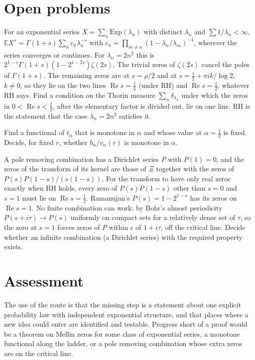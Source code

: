 \section{Open problems}\label{kr:sec:problems}
\begin{problem}\label{kr:prob:mellin}
For an exponential series $X=\sum_n\mathrm{Exp}(\lambda_n)$ with distinct $\lambda_n$ and $\sum1/\lambda_n<\infty$, $\mathbb EX^s=\Gamma(1+s)\sum_nc_n\lambda_n^{-s}$ with $c_n=\prod_{m\ne n}(1-\lambda_n/\lambda_m)^{-1}$, wherever the series converges or continues. For $\lambda_n=2n^2$ this is $2^{1-s}\Gamma(1+s)(1-2^{1-2s})\zeta(2s)$. The trivial zeros of $\zeta(2s)$ cancel the poles of $\Gamma(1+s)$. The remaining zeros are at $s=\rho/2$ and at $s=\frac12+\pi ik/\log2$, $k\ne0$, so they lie on the two lines $\operatorname{Re}s=\frac14$ (under RH) and $\operatorname{Re}s=\frac12$, whatever RH says. Find a condition on the Thorin measure $\sum_n\delta_{\lambda_n}$ under which the zeros in $0<\operatorname{Re}s<\frac12$, after the elementary factor is divided out, lie on one line. RH is the statement that the case $\lambda_n=2n^2$ satisfies it.
\end{problem}
\begin{problem}\label{kr:prob:mono}
Find a functional of $t_\alpha$ that is monotone in $\alpha$ and whose value at $\alpha=\frac12$ is fixed. Decide, for fixed $r$, whether $b_\alpha/v_\alpha(r)$ is monotone in $\alpha$.
\end{problem}
\begin{problem}\label{kr:prob:pole}
A pole removing combination has a Dirichlet series $P$ with $P(1)=0$, and the zeros of the transform of its kernel are those of $\Xi$ together with the zeros of $P(s)P(1-s)/(s(1-s))$. For the transform to have only real zeros exactly when RH holds, every zero of $P(s)P(1-s)$ other than $s=0$ and $s=1$ must lie on $\operatorname{Re}s=\frac12$. Ramanujan's $P(s)=1-2^{1-s}$ has its zeros on $\operatorname{Re}s=1$. No finite combination can work: by Bohr's almost periodicity $P(s+i\tau)\to P(s)$ uniformly on compact sets for a relatively dense set of $\tau$, so the zero at $s=1$ forces zeros of $P$ within $\epsilon$ of $1+i\tau$, off the critical line. Decide whether an infinite combination (a Dirichlet series) with the required property exists.
\end{problem}

\section{Assessment}\label{kr:sec:assess}
The use of the route is that the missing step is a statement about one explicit probability law with independent exponential structure, and that places where a new idea could enter are identified and testable. Progress short of a proof would be a theorem on Mellin zeros for some class of exponential series, a monotone functional along the ladder, or a pole removing combination whose extra zeros are on the critical line.
